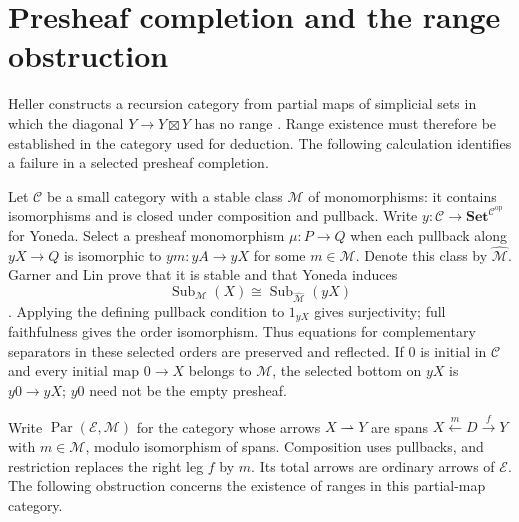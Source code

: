 \documentclass[11pt]{article}
\theoremstyle{definition}
\theoremstyle{remark}
\newcommand{\Set}{\mathbf{Set}}
\newcommand{\op}{\mathrm{op}}
\begin{document}
\section{Presheaf completion and the range obstruction}
\label{gen:completion}

Heller constructs a recursion category from partial maps of simplicial
sets in which the diagonal $Y\to Y\boxtimes Y$ has no range
\cite[\S10, Example~5, p.~1267]{Heller}. Range existence must therefore
be established in the category used for deduction. The following
calculation identifies a failure in a selected presheaf completion.

Let $\mathscr C$ be a small
category with a stable class $\mathcal M$ of monomorphisms: it contains
isomorphisms and is closed under composition and pullback. Write
$y:\mathscr C\to\Set^{\mathscr C^{\op}}$ for Yoneda. Select a
presheaf monomorphism $\mu:P\to Q$ when each pullback along
$yX\to Q$ is isomorphic to $ym:yA\to yX$ for some $m\in\mathcal M$.
Denote this class by $\widehat{\mathcal M}$.
Garner and Lin prove that it is stable and that Yoneda induces
\begin{equation}\label{gen:selected-domains}
 \operatorname{Sub}_{\mathcal M}(X)
 \cong\operatorname{Sub}_{\widehat{\mathcal M}}(yX)
\end{equation}
\cite[\S3.1 and Lemma~9]{GarnerLin}.
Applying the defining pullback condition to $1_{yX}$ gives surjectivity;
full faithfulness gives the order isomorphism. Thus equations for
complementary separators in these selected orders are preserved and
reflected. If $0$ is initial in $\mathscr C$ and every initial map
$0\to X$ belongs to $\mathcal M$, the selected bottom on
$yX$ is $y0\to yX$; $y0$ need not be the empty presheaf.

Write $\operatorname{Par}(\mathscr E,\mathcal M)$ for the category
whose arrows $X\rightharpoonup Y$ are spans
$X\xleftarrow{m}D\xrightarrow{f}Y$ with $m\in\mathcal M$, modulo
isomorphism of spans. Composition uses pullbacks, and restriction
replaces the right leg $f$ by $m$. Its total arrows are ordinary arrows
of $\mathscr E$. The following obstruction concerns the existence of
ranges in this partial-map category.
\end{document}
